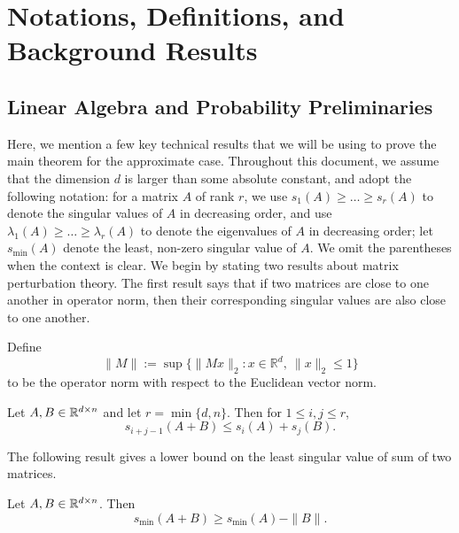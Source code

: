 \section{Notations, Definitions, and Background Results}\label{sec:preliminaries}

\subsection{Linear Algebra and Probability Preliminaries}

Here, we mention a few key technical results that we will
be using to prove the main theorem for the approximate
case. Throughout this document, we assume that the dimension
$d$ is larger than some absolute constant, and adopt the following
notation: for a matrix $A$ of rank $r$, we use $s_1(A)\geq\dots\geq s_r(A)$
to denote the singular values of $A$ in decreasing order, and
use $\lambda_1(A)\geq\dots\geq\lambda_r(A)$ to denote the
eigenvalues of $A$ in decreasing order; let $s_{\min}(A)$ denote
the least, non-zero singular value of $A$. We omit the parentheses
when the context is clear. We begin by stating
two results about matrix perturbation
theory. The first result says that if two matrices are close
to one another in operator norm, then their corresponding
singular values are also close to one another.

Define \[\|M\| := \sup \{\|Mx\|_2 : x \in \mathbb{R}^d, ~ \|x\|_2 \le 1\}\]
to be the operator norm with respect to the Euclidean vector
norm.

\begin{lemma}\label{lem:weyl-singular}
    Let $A,B \in \mathbb{R}^{d \times n}$ and let $r = \min\{d,n\}$.
    Then for $1 \leq i,j \leq r$,
    $$s_{i+j-1}(A+B) \leq s_i(A) + s_j(B).$$
\end{lemma}

The following result gives a lower bound on the least
singular value of sum of two matrices.

\begin{lemma}\label{lem:least-singular}
    Let $A,B \in \mathbb{R}^{d\times n}$. Then
    $$s_{\min}(A+B) \geq s_{\min}(A) - \|B\|.$$
\end{lemma}


